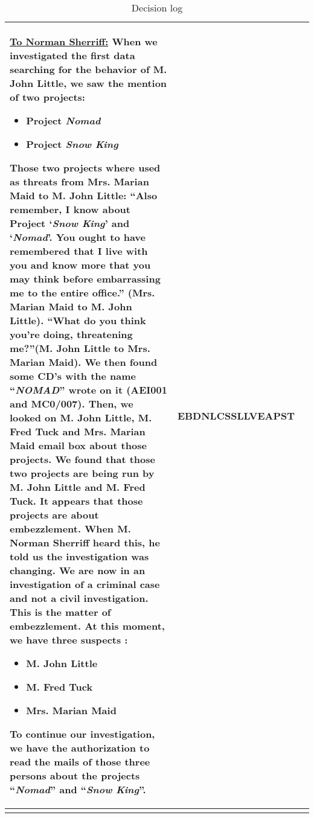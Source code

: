 \begin{longtable}{|p{}|p{}|p{}|}
		\underline{\textbf{To Norman Sherriff:}}\newline
		When we investigated the first data searching for the behavior of M. John Little, we saw the mention of two projects:
		\begin{itemize}
			\item Project \textit{Nomad}
			\item Project \textit{Snow King}
		\end{itemize}
		Those two projects where used as threats from Mrs. Marian Maid to M. John Little:
		\enquote{Also remember, I know about Project \enquote{\textit{Snow King}} and \enquote{\textit{Nomad}}. You ought to have remembered that I live with you and know more that you may think before embarrassing me to the entire office.} (Mrs. Marian Maid to M. John Little).\newline
		\enquote{What do you think you're doing, threatening me?}(M. John Little to Mrs. Marian Maid).\newline
		We then found some CD’s with the name \enquote{\textit{NOMAD}} wrote on it (AEI001 and MC0/007).\newline
		Then, we looked on M. John Little, M. Fred Tuck and Mrs. Marian Maid email box about those projects.\newline
		We found that those two projects are being run by M. John Little and M. Fred Tuck. It appears that those projects are about embezzlement.\newline
		When M. Norman Sherriff heard this, he told us the investigation was changing. We are now in an investigation of a criminal case and not a civil investigation.\newline
		This is the matter of embezzlement. At this moment, we have three suspects :
		\begin{itemize}
			\item M. John Little
			\item M. Fred Tuck
			\item Mrs. Marian Maid
		\end{itemize}
		To continue our investigation, we have the authorization to read the mails of those three persons about the projects \enquote{\textit{Nomad}} and \enquote{\textit{Snow King}}. & EBDN\newline LCSS\newline LLVE\newline APST\\\hline
	\caption{Decision log}
	\label{TAB:1}
	\end{longtable}
